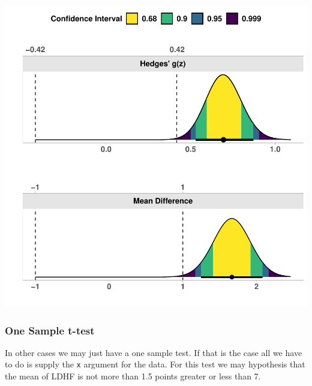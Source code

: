 \documentclass[]{interact}
\theoremstyle{plain}%
\theoremstyle{definition}
\theoremstyle{remark}
\newenvironment{Shaded}{\begin{snugshade}}{\end{snugshade}}
\newcommand{\AttributeTok}[1]{\textcolor[rgb]{0.77,0.63,0.00}{#1}}
\newcommand{\FloatTok}[1]{\textcolor[rgb]{0.00,0.00,0.81}{#1}}
\newcommand{\FunctionTok}[1]{\textcolor[rgb]{0.00,0.00,0.00}{#1}}
\newcommand{\NormalTok}[1]{#1}
\newcommand{\OtherTok}[1]{\textcolor[rgb]{0.56,0.35,0.01}{#1}}
\newcommand{\SpecialCharTok}[1]{\textcolor[rgb]{0.00,0.00,0.00}{#1}}
\newcommand{\StringTok}[1]{\textcolor[rgb]{0.31,0.60,0.02}{#1}}
\begin{document}
\includegraphics{Avocado_Update_files/figure-latex/unnamed-chunk-11-1.pdf}

\hypertarget{one-sample-t-test}{%
\subsubsection{One Sample t-test}\label{one-sample-t-test}}

In other cases we may just have a one sample test. If that is the case
all we have to do is supply the \texttt{x} argument for the data. For
this test we may hypothesis that the mean of LDHF is not more than 1.5
points greater or less than 7.

\begin{Shaded}
\end{Shaded}
\end{document}
